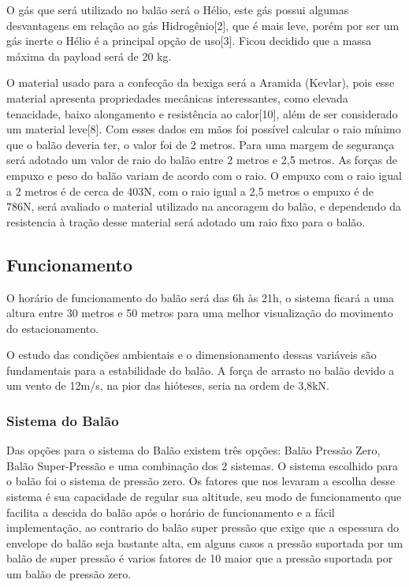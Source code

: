     O gás que será utilizado no balão será o Hélio, este gás possui algumas desvantagens em relação ao gás Hidrogênio[2], que é mais leve, porém por ser um gás inerte o Hélio é a principal opção  de uso[3]. Ficou decidido que a massa  máxima  da payload será de 20 kg.

    O material usado para a confecção da bexiga será a Aramida (Kevlar), pois  esse material apresenta propriedades mecânicas interessantes, como elevada tenacidade, baixo alongamento e resistência ao calor[10],  além de ser considerado um material leve[8]. Com esses dados em mãos foi possível calcular o raio mínimo que o balão deveria ter, o valor foi de 2 metros. Para uma margem de segurança será adotado um valor de raio do balão entre 2 metros e 2,5 metros. As forças de empuxo e peso do balão variam de acordo com o raio. O empuxo com o raio igual a 2 metros é de cerca de 403N, com o raio igual a 2,5 metros o empuxo é de 786N, será avaliado o material utilizado na ancoragem do balão,  e dependendo da resistencia à tração desse material será adotado um raio fixo para o balão.

\subsection{Funcionamento}
    O horário de funcionamento do balão será das 6h às 21h, o sistema ficará a uma altura entre 30 metros e 50 metros para uma melhor visualização do movimento do estacionamento.

    O estudo das condições ambientais e o dimensionamento dessas variáveis são fundamentais para a estabilidade do balão. A força de arrasto no balão devido a um vento de 12m/s, na pior das hióteses, seria na ordem de 3,8kN.

  \subsubsection{Sistema do Balão}
    Das opções para o sistema do Balão existem três opções: Balão Pressão Zero, Balão Super-Pressão e uma combinação dos 2 sistemas.
    O sistema escolhido para o balão foi o sistema de pressão zero. Os fatores que nos levaram a escolha desse sistema é sua capacidade de regular sua altitude, seu modo de funcionamento que facilita a descida do balão após o horário de funcionamento e a fácil implementação, ao contrario do balão super pressão que exige que a espessura do envelope do balão seja bastante alta, em alguns casos a pressão suportada por um balão de super pressão é varios fatores de 10 maior que a pressão suportada por um balão de pressão zero.

